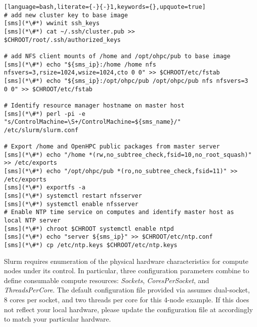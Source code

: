 \documentclass[letterpaper]{article}
\begin{document}
\begin{lstlisting}[language=bash,literate={-}{-}1,keywords={},upquote=true]
# add new cluster key to base image
[sms](*\#*) wwinit ssh_keys
[sms](*\#*) cat ~/.ssh/cluster.pub >> $CHROOT/root/.ssh/authorized_keys

# add NFS client mounts of /home and /opt/ohpc/pub to base image
[sms](*\#*) echo "${sms_ip}:/home /home nfs nfsvers=3,rsize=1024,wsize=1024,cto 0 0" >> $CHROOT/etc/fstab
[sms](*\#*) echo "${sms_ip}:/opt/ohpc/pub /opt/ohpc/pub nfs nfsvers=3 0 0" >> $CHROOT/etc/fstab

# Identify resource manager hostname on master host
[sms](*\#*) perl -pi -e "s/ControlMachine=\S+/ControlMachine=${sms_name}/" /etc/slurm/slurm.conf

# Export /home and OpenHPC public packages from master server
[sms](*\#*) echo "/home *(rw,no_subtree_check,fsid=10,no_root_squash)" >> /etc/exports
[sms](*\#*) echo "/opt/ohpc/pub *(ro,no_subtree_check,fsid=11)" >> /etc/exports
[sms](*\#*) exportfs -a
[sms](*\#*) systemctl restart nfsserver
[sms](*\#*) systemctl enable nfsserver
# Enable NTP time service on computes and identify master host as local NTP server
[sms](*\#*) chroot $CHROOT systemctl enable ntpd
[sms](*\#*) echo "server ${sms_ip}" >> $CHROOT/etc/ntp.conf
[sms](*\#*) cp /etc/ntp.keys $CHROOT/etc/ntp.keys

\end{lstlisting}


\begin{center}
\begin{tcolorbox}[]
  \small Slurm requires enumeration of the physical hardware characteristics
  for compute nodes under its control. In particular, three configuration
  parameters combine to define consumable compute resources: {\em Sockets},
  {\em CoresPerSocket}, and {\em ThreadsPerCore}. The default configuration
  file provided via \OHPC{} assumes dual-socket, 8 cores per socket, and two
  threads per core for this 4-node example. If this does not reflect your local
  hardware, please update the configuration file at
   accordingly to match your particular hardware.
\end{tcolorbox}
\end{center}


\end{document}
